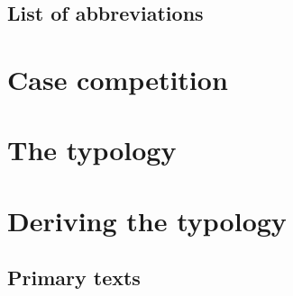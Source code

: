 \documentclass[hidelinks,a4paper,twoside,openright,12pt]{memoir}
\begin{document}
\phantom{x}
\vspace{-7em}
\listoftables
\clearpage

\phantom{x}
\vspace{-7em}
\listoffigures
\clearpage

\chapter*[List of abbreviations]{List of abbreviations}
\begingroup
  \setlength{\LTleft}{-\tabcolsep}
\printacronyms[include=abbr, heading=none]
\endgroup
{}
\clearpage

\mainmatter
\setcounter{secnumdepth}{4}



\part{Case competition}\label{part:case-facts}



\part{The typology}\label{part:variation}



\part{Deriving the typology}\label{part:deriving}








\backmatter

\clearpage
\chapter*{Primary texts}
\begingroup
  \setlength{\LTleft}{-\tabcolsep}
\printacronyms[include=texts, heading=none]
\endgroup
{}

\newrefcontext[sorting=nyt]
\printbibliography

\end{document}
